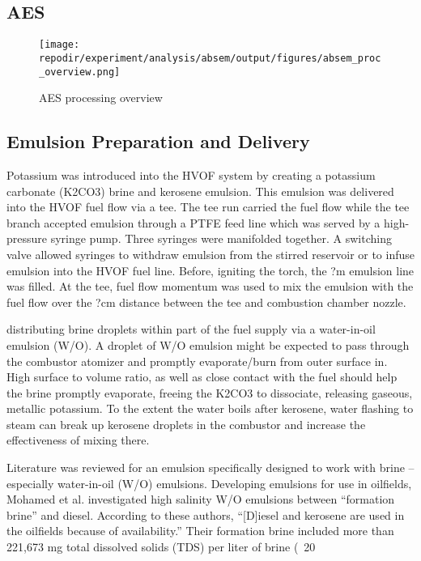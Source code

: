 \clearpage
\subsection{AES}
\begin{figure}[]
    \centering
    \texttt{[image: \\repodir/experiment/analysis/absem/output/figures/absem\_proc\_overview.png]}
    \caption{AES processing overview}
    \label{fig:SI_AES_proc_overview}
\end{figure}


\clearpage
\subsection{Emulsion Preparation and Delivery}

Potassium was introduced into the HVOF system by creating a potassium carbonate (K2CO3) brine and kerosene emulsion. This emulsion was delivered into the HVOF fuel flow via a tee. The tee run carried the fuel flow while the tee branch accepted emulsion through a PTFE feed line which was served by a high-pressure syringe pump. Three syringes were manifolded together. A switching valve allowed syringes to withdraw emulsion from the stirred reservoir or to infuse emulsion into the HVOF fuel line. Before, igniting the torch, the ?m emulsion line was filled. At the tee, fuel flow momentum was used to mix the emulsion with the fuel flow over the ?cm distance between the tee and combustion chamber nozzle. 


distributing brine droplets within part of the fuel supply via a water-in-oil emulsion (W/O). A droplet of W/O emulsion might be expected to pass through the combustor atomizer and promptly evaporate/burn from outer surface in. High surface to volume ratio, as well as close contact with the fuel should help the brine promptly evaporate, freeing the K2CO3 to dissociate, releasing gaseous, metallic potassium. To the extent the water boils after kerosene, water flashing to steam can break up kerosene droplets in the combustor and increase the effectiveness of mixing there. 

Literature was reviewed for an emulsion specifically designed to work with brine – especially water-in-oil (W/O) emulsions.  Developing emulsions for use in oilfields, Mohamed et al.\cite{mohamedInfluenceSurfactantStructure2017a} investigated high salinity W/O emulsions between “formation brine” and diesel. According to these authors, “[D]iesel and kerosene are used in the oilfields because of availability.” Their formation brine included more than 221,673 mg total dissolved solids (TDS) per liter of brine (~20%

